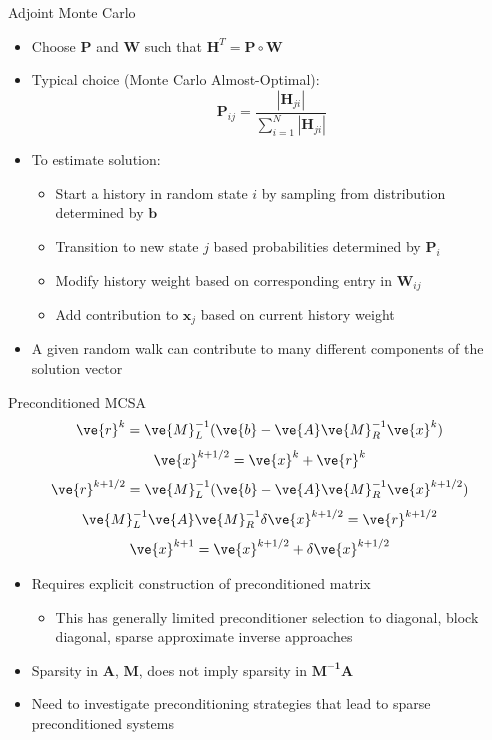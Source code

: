 \documentclass{beamer}
\begin{document}
\begin{frame}{Adjoint Monte Carlo}
\begin{itemize}
  \item Choose $\mathbf{P}$ and $\mathbf{W}$ such that
    $\mathbf{H}^{T} = \mathbf{P} \circ \mathbf{W}$
  \item Typical choice (Monte Carlo Almost-Optimal):
    \begin{equation*}
      \mathbf{P}_{ij} = \frac{| \mathbf{H}_{ji}| }
      {\sum_{i=1}^{N} | \mathbf{H}_{ji} |}
    \end{equation*}
  \item To estimate solution:
    \begin{itemize}
      \item Start a history in random state $i$ by sampling from distribution
        determined by $\mathbf{b}$
      \item Transition to new state $j$ based probabilities determined by
        $\mathbf{P}_i$
      \item Modify history weight based on corresponding entry in
        $\mathbf{W}_{ij}$
      \item Add contribution to $\mathbf{x}_j$ based on current history weight
    \end{itemize}
  \item A given random walk can contribute to many different components of
    the solution vector
\end{itemize}
\end{frame}


\begin{frame}{Preconditioned MCSA}
\vspace*{-0.2in}
  {
    \small
    \[
    \ve{r}^{k} = \ve{M}_L^{-1}(\ve{b}-\ve{A}\ve{M}_R^{-1}\ve{x}^{k})
    \]
    \[
    \ve{x}^{k+1/2} = \ve{x}^k + \ve{r}^k
    \]
    \[
    \ve{r}^{k+1/2} = \ve{M}_L^{-1}(\ve{b}-\ve{A}\ve{M}_R^{-1}\ve{x}^{k+1/2})
    \]
    \[
    \ve{M}_L^{-1}\ve{A}\ve{M}_R^{-1}\delta\ve{x}^{k+1/2} = \ve{r}^{k+1/2}
    \]
    \[
    \ve{x}^{k+1} = \ve{x}^{k+1/2} + \delta \ve{x}^{k+1/2}
    \]
  }
  \vspace*{-0.1in}
  \begin{itemize}
    \item Requires explicit construction of preconditioned matrix
      \begin{itemize}
        \item This has generally limited preconditioner selection to diagonal,
          block diagonal, sparse approximate inverse approaches
      \end{itemize}
    \vfill
    \item Sparsity in $\mathbf{A}$, $\mathbf{M}$, does not imply sparsity
      in $\mathbf{M^{-1}A}$
    \vfill
    \item Need to investigate preconditioning strategies that lead to sparse
      preconditioned systems
  \end{itemize}
\end{frame}
\end{document}

